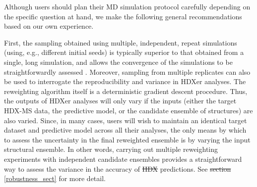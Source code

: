 \documentclass[9pt,tutorial]{livecoms}
\providecommand{\DIFadd}[1]{{\protect\color{blue}\uwave{#1}}} %
\providecommand{\DIFdel}[1]{{\protect\color{red}\sout{#1}}}                      %
\providecommand{\DIFaddbegin}{} %
\providecommand{\DIFaddend}{} %
\providecommand{\DIFdelbegin}{} %
\providecommand{\DIFdelend}{} %
\begin{document}
Although users should plan their MD simulation protocol carefully depending on the specific question at hand, we make the following general recommendations based on our own experience.

First, the sampling obtained using multiple, independent, repeat simulations (using, e.g., different initial seeds) is typically superior to that obtained from a single, long simulation, and allows the convergence of the simulations to be straightforwardly assessed \cite{Hess2002,Faraldo-Gomez2004,Grossfield2019}. 
Moreover, sampling from multiple replicates can also be used to interrogate the reproducibility and variance in HDXer analyses.
The reweighting algorithm itself is a deterministic gradient descent procedure.
Thus, the outputs of HDXer analyses will only vary if the inputs (either the target HDX-MS data, the predictive model, or the candidate ensemble of structures) are also varied.
Since, in many cases, users will wish to maintain an identical target dataset and predictive model across all their analyses, the only means by which to assess the uncertainty in the final reweighted ensemble is by varying the input structural ensemble.
In other words, carrying out multiple reweighting experiments with independent candidate ensembles provides a straightforward way to assess the variance in the accuracy of \DIFdelbegin \DIFdel{HDX }\DIFdelend \DIFaddbegin \DIFadd{the }\DIFaddend predictions. 
See \DIFdelbegin \DIFdel{section }\DIFdelend \DIFaddbegin \DIFadd{Section }\DIFaddend \ref{robustness_sect} for more detail.
\end{document}

